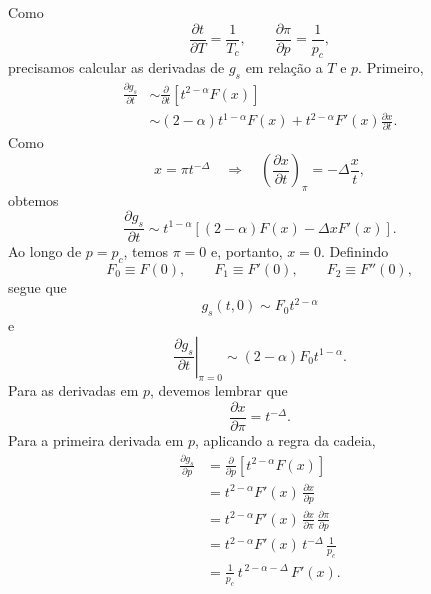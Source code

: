 \documentclass[11pt,a4paper]{article}
\newcommand{\pd}[2]{\frac{\partial #1}{\partial #2}}
\begin{document}
%
Como
%
\begin{equation}
    \frac{\partial t}{\partial T}=\frac{1}{T_c},
    \qquad
    \frac{\partial \pi}{\partial p}=\frac{1}{p_c},
    \label{eq:dt_dT_dpi_dp}
\end{equation}
%
precisamos calcular as derivadas de \(g_s\) em relação a \(T\) e \(p\). Primeiro,
%
\begin{align}
    \pd{g_s}{t}
    &\sim
    \pd{}{t}\left[t^{2-\alpha}F(x)\right] \nonumber\\
    &\sim
    (2-\alpha)t^{1-\alpha}F(x)
    + t^{2-\alpha}F'(x)\pd{x}{t}.
\end{align}
%
Como
%
\begin{equation}
    x=\pi t^{-\Delta}
    \quad\Longrightarrow\quad
    \left(\frac{\partial x}{\partial t}\right)_\pi
    =-\Delta\frac{x}{t},
\end{equation}
%
obtemos
%
\begin{equation}
    \pd{g_s}{t}
    \sim
    t^{1-\alpha}
    \left[(2-\alpha)F(x)-\Delta xF'(x)\right].
    \label{eq:dgdt_general}
\end{equation}
%
Ao longo de \(p=p_c\), temos \(\pi=0\) e, portanto, \(x=0\). Definindo
%
\begin{equation}
    F_0\equiv F(0),
    \qquad
    F_1\equiv F'(0),
    \qquad
    F_2\equiv F''(0),
    \label{eq:Fcoeff}
\end{equation}
%
segue que
%
\begin{equation}
    g_s(t,0)\sim F_0 t^{2-\alpha}
\end{equation}
%
e
%
\begin{equation}
    \left.\pd{g_s}{t}\right|_{\pi=0}
    \sim
    (2-\alpha)F_0 t^{1-\alpha}.
    \label{eq:dgdt_pc}
\end{equation}
%
Para as derivadas em \(p\), devemos lembrar que
%
\begin{equation}
    \frac{\partial x}{\partial \pi}=t^{-\Delta}.
\end{equation}
%
Para a primeira derivada em \(p\), aplicando a regra da cadeia,
%
\begin{align}
    \pd{g_s}{p}
    &=
    \pd{}{p}\left[t^{2-\alpha}F(x)\right] \nonumber\\
    &=
    t^{2-\alpha}F'(x)\,\pd{x}{p} \nonumber\\
    &=
    t^{2-\alpha}F'(x)\,
    \pd{x}{\pi}\,\pd{\pi}{p} \nonumber\\
    &=
    t^{2-\alpha}F'(x)\,
    t^{-\Delta}\,\frac{1}{p_c} \nonumber\\
    &=
    \frac{1}{p_c}\,
    t^{\,2-\alpha-\Delta}\,
    F'(x).
    \label{eq:dgp_general}
\end{align}
\end{document}
